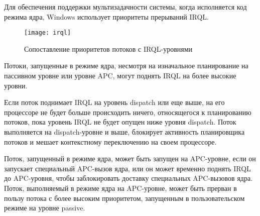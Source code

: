 Для обеспечения поддержки мультизадачности системы, когда
исполняется код режима ядра, Windows использует приоритеты
прерываний IRQL.

\begin{figure}[H]
    \centering
    \texttt{[image: irql]}
    \caption{Сопоставление приоритетов потоков с IRQL-уровнями}
\end{figure}

Потоки, запущенные в режиме ядра, несмотря на изначальное планирование
на пассивном уровне или уровне APC, могут поднять IRQL на более
высокие уровни.

Если поток поднимает IRQL на уровень dispatch или еще выше, на
его процессоре не будет больше происходить ничего, относящегося
к планированию потоков, пока уровень IRQL не будет опущен ниже
уровня dispatch. Поток выполняется на dispatch-уровне и выше,
блокирует активность планировщика потоков и мешает контекстному
переключению на своем процессоре.

Поток, запущенный в режиме ядра, может быть запущен на APC-уровне,
если он запускает специальный APC-вызов ядра, или он может временно
поднять IRQL до APC-уровня, чтобы заблокировать доставку специальных
APC-вызовов ядра. Поток, выполняемый в режиме ядра на APC-уровне,
может быть прерван в пользу потока с более высоким приоритетом,
запущенным в пользовательском режиме на уровне passive.
